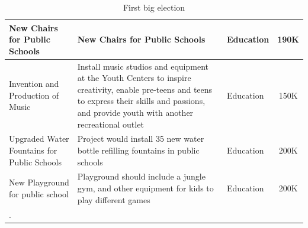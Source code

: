 \documentclass[10pt]{article}
\begin{document}
\begin{appendices}
\begin{longtable}[ht!]{|p{4cm}|p{8cm}|p{3cm}|c|}
    \hline
    New Chairs for Public Schools & New Chairs for Public Schools & Education & 190K\\
    \hline
    Invention and Production of Music & Install music studios and equipment at the Youth Centers to inspire creativity, enable pre-teens and teens to express their skills and passions, and provide youth with another recreational outlet & Education & 150K\\
    \hline
    Upgraded Water Fountains for Public Schools & Project would install 35 new water bottle refilling fountains in public schools & Education & 200K\\
    \hline
    New Playground for public school & Playground should include a jungle gym, and other equipment for kids to play different games & Education & 200K\\

     \hline
  \caption{First big election}\label{tab:third_elc}.
\end{longtable}


\end{appendices}
\end{document}
